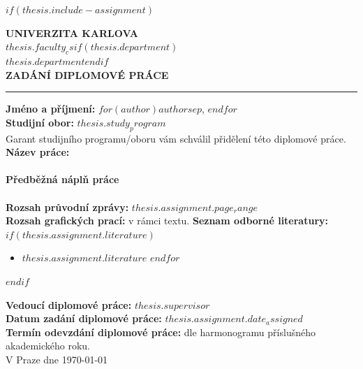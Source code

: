 \documentclass[
$for(babel-otherlangs)$
  $babel-otherlangs$,
$endfor$
$if(babel-lang)$
  $babel-lang$,
$endif$
$if(fontsize)$
  $fontsize$,
$endif$
$if(papersize)$
  $papersize$paper,
$endif$
$for(classoption)$
  $classoption$$sep$,
$endfor$
]{$documentclass$}
\begin{document}
$if(thesis.include-assignment)$
{
\pagestyle{empty}

\begin{center}
\textbf{UNIVERZITA KARLOVA}\\
\textbf{$thesis.faculty_cs$}$if(thesis.department)$\\
$thesis.department$$endif$\\[10mm]
{\large\textbf{ZADÁNÍ DIPLOMOVÉ PRÁCE}}
\end{center}

\vspace{4mm}
\noindent\rule{\textwidth}{0.4pt}
\vspace{4mm}

\noindent\textbf{Jméno a příjmení:} $for(author)$$author$$sep$, $endfor$\\[2mm]
\noindent\textbf{Studijní obor:} $thesis.study_program$\\[2mm]
\noindent Garant studijního programu/oboru vám schválil přidělení této diplomové práce.\\[6mm]

\noindent\textbf{Název práce:}\\[2mm]
\noindent{}\\[6mm]

\noindent\textbf{Předběžná náplň práce}\\[2mm]
\noindent{}\\[6mm]
\noindent\textbf{Rozsah průvodní zprávy:} $thesis.assignment.page_range$\\[2mm]
\noindent\textbf{Rozsah grafických prací:} v rámci textu.
\newpage
\noindent\textbf{Seznam odborné literatury:}\\[2mm]
$if(thesis.assignment.literature)$
\begin{itemize}\setlength{\itemsep}{4mm}
$for(thesis.assignment.literature)$
  \item $thesis.assignment.literature$
$endfor$
\end{itemize}
$endif$
\vspace{8mm}

\noindent\textbf{Vedoucí diplomové práce:} $thesis.supervisor$\\[3mm]
\noindent\textbf{Datum zadání diplomové práce:} $thesis.assignment.date_assigned$\\[3mm]
\noindent\textbf{Termín odevzdání diplomové práce:} dle harmonogramu příslušného akademického roku.\\[16mm]
\noindent V Praze dne \mydate\today\\[26mm]

}
\end{document}
